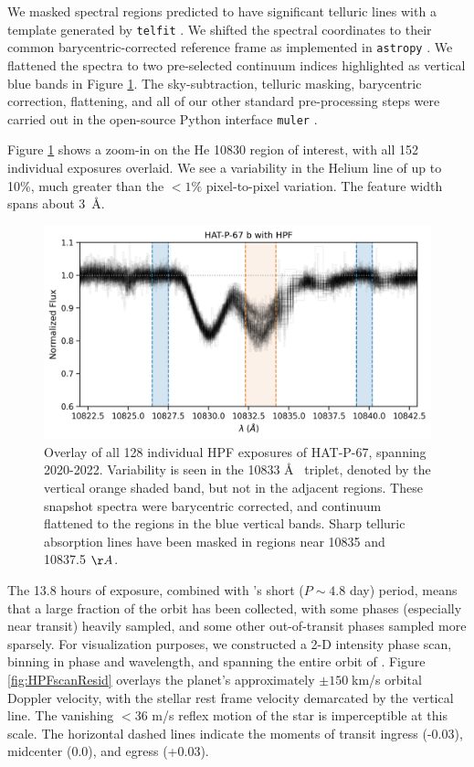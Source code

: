 \documentclass[twocolumn]{aastex631}
\begin{document}
We masked spectral regions predicted to have significant telluric lines with a template generated by \texttt{telfit} \citep{2014AJ....148...53G}.  We shifted the spectral coordinates to their common barycentric-corrected reference frame \citep{2014PASP..126..838W} as implemented in \texttt{astropy} \citep{2013A&A...558A..33A,2018AJ....156..123A,2022ApJ...935..167A}.  We flattened the spectra to two pre-selected continuum indices highlighted as vertical blue bands in Figure \ref{fig:HPFheliumOverview}.  The sky-subtraction, telluric masking, barycentric correction, flattening, and all of our other standard pre-processing steps were carried out in the open-source Python interface \texttt{muler} \citep{2022JOSS....7.4302G}.

Figure \ref{fig:HPFheliumOverview} shows a zoom-in on the He 10830 region of interest, with all 152 individual exposures overlaid.  We see a variability in the Helium line of up to 10\%, much greater than the $<1\%$ pixel-to-pixel variation.  The feature width spans about 3~\AA.

\begin{figure}
    \includegraphics[width=\linewidth]{figures/HAT_P_67b_He_spectrum.png}
    \caption{Overlay of all 128 individual HPF exposures of HAT-P-67, spanning 2020-2022. Variability is seen in the  10833 \AA~ triplet, denoted by the vertical orange shaded band, but not in the adjacent regions.  These snapshot spectra were barycentric corrected, and continuum flattened to the regions in the blue vertical bands.  Sharp telluric absorption lines have been masked in regions near 10835 and 10837.5 $\AA$.}
    \label{fig:HPFheliumOverview}
\end{figure}


The 13.8 hours of exposure, combined with 's short ($P\sim4.8$ day) period, means that a large fraction of the orbit has been collected, with some phases (especially near transit) heavily sampled, and some other out-of-transit phases sampled more sparsely. For visualization purposes, we constructed a 2-D intensity phase scan, binning in phase and wavelength, and spanning the entire orbit of .  Figure \ref{fig:HPFscanResid} overlays the planet's approximately $\pm150\;$km/s orbital Doppler velocity, with the stellar rest frame velocity demarcated by the vertical line.  The vanishing $<36$ m/s reflex motion of the star is imperceptible at this scale.  The horizontal dashed lines indicate the moments of transit ingress (-0.03), midcenter (0.0), and egress (+0.03).
\end{document}
